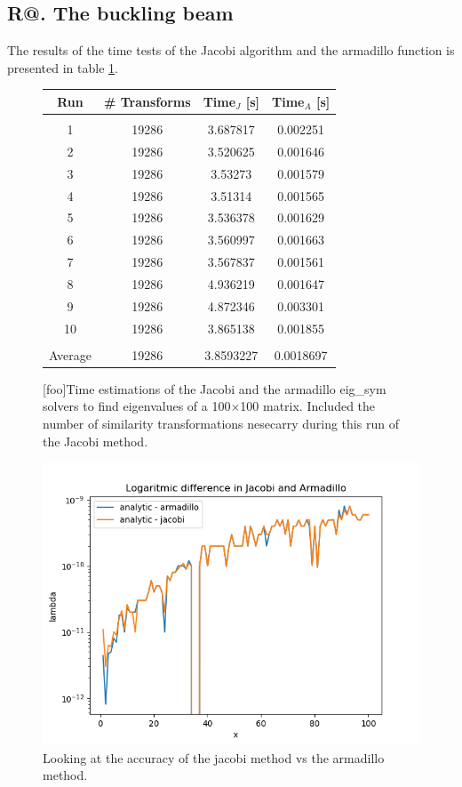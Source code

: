 \documentclass[%
reprint,
amsmath, 
amssymb, 
aps,]{revtex4-1}
\makeatletter
\newcommand*{\rom}[1]{\expandafter\@slowromancap\romannumeral #1@}
\makeatother
\begin{document}
		\subsection*{R\rom{1}. The buckling beam} \noindent 
The results of the time tests of the Jacobi algorithm and the armadillo function is presented in table \ref{tab1}.
			\begin{figure}[H]
\centering 
				\begin{tabular} {|c|c|c|c|}
\hline
Run & \# Transforms & Time$_J$ [s] & Time$_A$ [s] \\ 
\hline
 &  &  & \\ 
 1 & 19286 & 3.687817             & 0.002251            \\ 
 2 & 19286 & 3.520625             & 0.001646            \\ 
 3 & 19286 & 3.53273             & 0.001579            \\ 
 4 & 19286 & 3.51314             & 0.001565            \\ 
 5 & 19286 & 3.536378             & 0.001629            \\ 
 6 & 19286 & 3.560997             & 0.001663            \\ 
 7 & 19286 & 3.567837             & 0.001561            \\ 
 8 & 19286 & 4.936219             & 0.001647            \\ 
 9 & 19286 & 4.872346             & 0.003301            \\ 
10 & 19286 & 3.865138             & 0.001855            \\ 
\hline 
 &  &  & \\
Average &19286& 3.8593227&0.0018697 \\ 
\hline
				\end{tabular}
[foo]{Time estimations of the Jacobi and the armadillo eig\_sym solvers to find eigenvalues of a 100$\times$100 matrix. Included the number of similarity transformations nesecarry during this run of the Jacobi method. \label{tab1}}
			\end{figure}
			\begin{figure}
\centering
\includegraphics[scale = 0.6]{results_2b.png}
\caption{Looking at the accuracy of the jacobi method vs the armadillo method.}
\label{fig:my_label}
			\end{figure}
\end{document}
